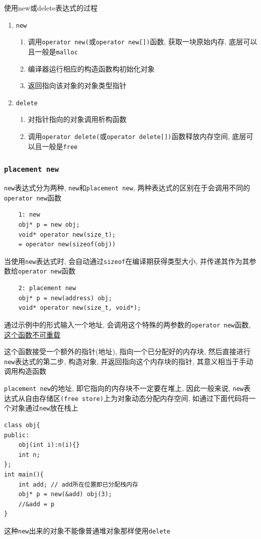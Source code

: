 使用new或delete表达式的过程
\begin{enumerate}
	\item {\tt new}
	\begin{enumerate}
		\item 调用{\tt operator new(}或{\tt operator new[])}函数, 获取一块原始内存, 
			底层可以且一般是{\tt malloc}
		\item 编译器运行相应的构造函数构初始化对象
		\item 返回指向该对象的对象类型指针
	\end{enumerate}
	\item {\tt delete}
	\begin{enumerate}
		\item 对指针指向的对象调用析构函数
		\item 调用{\tt operator delete(}或{\tt operator delete[])}函数释放内存空间, 底层可以且一般是{\tt free}
	\end{enumerate}
\end{enumerate}
\subsubsection{\tt placement new}
{\tt new}表达式分为两种, {\tt new}和{\tt placement new}, 两种表达式的区别在于会调用不同的{\tt operator new}函数
\begin{lstlisting}
	1: new
	obj* p = new obj;
	void* operator new(size_t);
	= operator new(sizeof(obj))
\end{lstlisting}
当使用{\tt new}表达式时, 会自动通过{\tt sizeof}在编译期获得类型大小, 并传递其作为其参数给{\tt operator new}函数
\begin{lstlisting}
	2: placement new
	obj* p = new(address) obj;
	void* operator new(size_t, void*); 
\end{lstlisting}

通过示例中的形式输入一个地址, 会调用这个特殊的两参数的{\tt operator new}函数, \uline{这个函数不可重载}

这个函数接受一个额外的指针(地址), 指向一个已分配好的内存块, 然后直接进行{\tt new}表达式的第二步, 构造对象, 
	并返回指向这个内存块的指针, 其意义相当于手动调用构造函数

{\tt placement new}的地址, 即它指向的内存块不一定要在堆上, 因此一般来说, {\tt new}表达式从自由存储区{\tt (free store)}上为对象动态分配内存空间,
	如通过下面代码将一个对象通过{\tt new}放在栈上

\begin{lstlisting}
class obj{
public:
	obj(int i):n(i){}
	int n;
};
int main(){
	int add; // add所在位置即已分配栈内存
	obj* p = new(&add) obj(3);
	//&add = p
}
\end{lstlisting}
这种{\tt new}出来的对象不能像普通堆对象那样使用{\tt delete}


